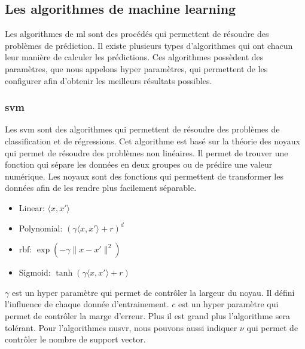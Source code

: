 \subsection{Les algorithmes de machine learning}
Les algorithmes de \acrlong{ml} sont des procédés qui permettent de résoudre des problèmes de prédiction.
Il existe plusieurs types d'algorithmes qui ont chacun leur manière de calculer les prédictions.
Ces algorithmes possèdent des paramètres, que nous appelons hyper paramètres, qui permettent de les configurer afin d'obtenir les meilleurs résultats possibles.

\subsubsection{\acrlong{svm}}
\label{analyse:ml:algorithme:svm}
Les \acrfull{svm} sont des algorithmes qui permettent de résoudre des problèmes de classification et de régressions.
Cet algorithme est basé sur la théorie des noyaux qui permet de résoudre des problèmes non linéaires.
Il permet de trouver une fonction qui sépare les données en deux groupes ou de prédire une valeur numérique.
Les noyaux sont des fonctions qui permettent de transformer les données afin de les rendre plus facilement séparable.
\begin{itemize}
    \item Linear: $\langle x, x'\rangle$
    \item Polynomial: $(\gamma \langle x, x'\rangle + r)^d$
    \item \acrfull{rbf}: $\exp(-\gamma \|x - x'\|^2)$
    \item Sigmoid: $\tanh(\gamma \langle x, x'\rangle + r)$
\end{itemize}
$\gamma$ est un hyper paramètre qui permet de contrôler la largeur du noyau. Il défini l'influence de chaque donnée d'entrainement.
$c$ est un hyper paramètre qui permet de contrôler la marge d'erreur. Plus il est grand plus l'algorithme sera tolérant.
Pour l'algorithmes \acrfull{nusvr}, nous pouvons aussi indiquer $\nu$ qui permet de contrôler le nombre de support vector.

